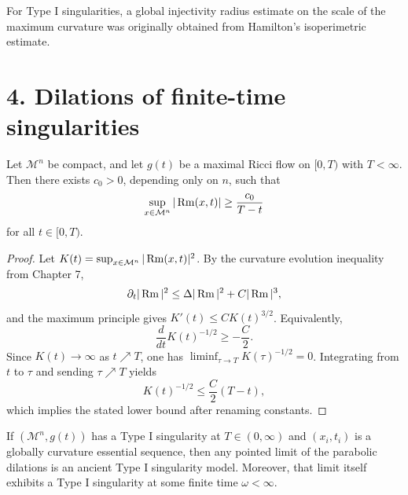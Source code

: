 \begin{remark}
\label{ch08-rem-hamilton-injectivity}
For Type I singularities, a global injectivity radius estimate on the scale of the maximum curvature was originally obtained from Hamilton's isoperimetric estimate.
\end{remark}

\section*{4. Dilations of finite-time singularities}

\begin{lemma}
\label{ch08-lem-finite-time-blowup-rate}
Let \(\mathcal M^n\) be compact, and let \(g(t)\) be a maximal Ricci flow on \([0,T)\) with \(T<\infty\). Then there exists \(c_0>0\), depending only on \(n\), such that
\[
\sup_{x\in\mathcal M^n}|\operatorname{Rm}(x,t)|\ge \frac{c_0}{T-t}
\]
for all \(t\in[0,T)\).
\end{lemma}

\begin{proof}
Let \(K(t)=\sup_{x\in\mathcal M^n}|\operatorname{Rm}(x,t)|^2\). By the curvature evolution inequality from Chapter 7,
\[
\partial_t |\operatorname{Rm}|^2\le \Delta |\operatorname{Rm}|^2+C|\operatorname{Rm}|^3,
\]
and the maximum principle gives \(K'(t)\le C K(t)^{3/2}\). Equivalently,
\[
\frac{d}{dt}K(t)^{-1/2}\ge -\frac C2.
\]
Since \(K(t)\to\infty\) as \(t\nearrow T\), one has \(\liminf_{\tau\to T}K(\tau)^{-1/2}=0\). Integrating from \(t\) to \(\tau\) and sending \(\tau\nearrow T\) yields
\[
K(t)^{-1/2}\le \frac C2(T-t),
\]
which implies the stated lower bound after renaming constants.
\end{proof}

\begin{proposition}
\label{ch08-prop-type-i-limits}
If \((\mathcal M^n,g(t))\) has a Type I singularity at \(T\in(0,\infty)\) and \((x_i,t_i)\) is a globally curvature essential sequence, then any pointed limit of the parabolic dilations is an ancient Type I singularity model. Moreover, that limit itself exhibits a Type I singularity at some finite time \(\omega<\infty\).
\end{proposition}

